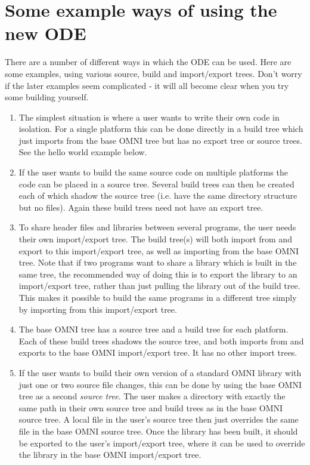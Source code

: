 \documentclass[11pt,twoside,onecolumn]{article}
\begin{document}
\section{Some example ways of using the new ODE}

There are a number of different ways in which the ODE can be used.  Here are
some examples, using various source, build and import/export trees.  Don't
worry if the later examples seem complicated - it will all become clear when
you try some building yourself.

\begin{enumerate}

\item
\label{buildtreeonly}
The simplest situation is where a user wants to write their own code in
isolation.  For a single platform this can be done directly in a build tree
which just imports from the base OMNI tree but has no export tree or source
trees.  See the hello world example below.

\item If the user wants to build the same source code on multiple platforms the
code can be placed in a source tree.  Several build trees can then be created
each of which shadow the source tree (i.e. have the same directory structure
but no files).  Again these build trees need not have an export tree.

\item
\label{twoimporttrees}
To share header files and libraries between several programs, the user needs
their own import/export tree.  The build tree(s) will both import from and
export to this import/export tree, as well as importing from the base OMNI
tree.  Note that if two programs want to share a library which is built in the
same tree, the recommended way of doing this is to export the library to an
import/export tree, rather than just pulling the library out of the build tree.
This makes it possible to build the same programs in a different tree simply by
importing from this import/export tree.

\item The base OMNI tree has a source tree and a build tree for each platform.
Each of these build trees shadows the source tree, and both imports from and
exports to the base OMNI import/export tree.  It has no other import trees.

\item If the user wants to build their own version of a standard OMNI library
with just one or two source file changes, this can be done by using the base
OMNI tree as a second {\em source tree}.  The user makes a directory with
exactly the same path in their own source tree and build trees as in the base
OMNI source tree.  A local file in the user's source tree then just overrides
the same file in the base OMNI source tree.  Once the library has been built,
it should be exported to the user's import/export tree, where it can be used to
override the library in the base OMNI import/export tree.


\end{enumerate}
\end{document}
